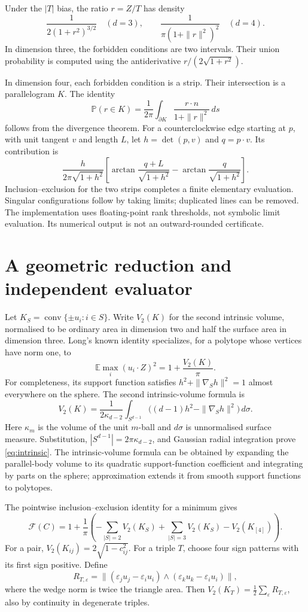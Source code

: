 \documentclass[11pt,a4paper]{article}
\theoremstyle{remark}\newtheorem{remark}[theorem]{Remark}
\newcommand{\E}{\mathbb E}
\newcommand{\Prb}{\mathbb P}
\newcommand{\F}{\mathcal F}
\begin{document}
Under the $|T|$ bias, the ratio $r=Z/T$ has density
\[
 \frac1{2(1+r^2)^{3/2}}\quad(d=3),\qquad
 \frac1{\pi(1+\|r\|^2)^2}\quad(d=4).
\]
In dimension three, the forbidden conditions are two intervals. Their union probability is computed using the antiderivative $r/(2\sqrt{1+r^2})$.

In dimension four, each forbidden condition is a strip. Their intersection is a parallelogram $K$. The identity
\[
 \Prb(r\in K)=\frac1{2\pi}\int_{\partial K}\frac{r\cdot n}{1+\|r\|^2}\,ds
\]
follows from the divergence theorem. For a counterclockwise edge starting at $p$, with unit tangent $v$ and length $L$, let $h=\det(p,v)$ and $q=p\cdot v$. Its contribution is
\[
 \frac{h}{2\pi\sqrt{1+h^2}}
 \left[\arctan\frac{q+L}{\sqrt{1+h^2}}
       -\arctan\frac{q}{\sqrt{1+h^2}}\right].
\]
Inclusion--exclusion for the two strips completes a finite elementary evaluation. Singular configurations follow by taking limits; duplicated lines can be removed. The implementation uses floating-point rank thresholds, not symbolic limit evaluation. Its numerical output is not an outward-rounded certificate.

\section{A geometric reduction and independent evaluator}\label{sec:intrinsic}
Let $K_S=\operatorname{conv}\{\pm u_i:i\in S\}$. Write $V_2(K)$ for the second intrinsic volume, normalised to be ordinary area in dimension two and half the surface area in dimension three. Long's known identity \cite[Theorem 1.2]{long} specializes, for a polytope whose vertices have norm one, to
\begin{equation}\label{eq:intrinsic}
 \E\max_i(u_i\cdot Z)^2=1+\frac{V_2(K)}\pi.
\end{equation}
For completeness, its support function satisfies $h^2+\|\nabla_Sh\|^2=1$ almost everywhere on the sphere. The second intrinsic-volume formula is
\[
 V_2(K)=\frac1{2\kappa_{d-2}}
 \int_{S^{d-1}}\big((d-1)h^2-\|\nabla_Sh\|^2\big)\,d\sigma.
\]
Here $\kappa_m$ is the volume of the unit $m$-ball and $d\sigma$ is unnormalised surface measure. Substitution, $|S^{d-1}|=2\pi\kappa_{d-2}$, and Gaussian radial integration prove \eqref{eq:intrinsic}. The intrinsic-volume formula can be obtained by expanding the parallel-body volume to its quadratic support-function coefficient and integrating by parts on the sphere; approximation extends it from smooth support functions to polytopes.

The pointwise inclusion--exclusion identity for a minimum gives
\begin{equation}\label{eq:ie-v2}
 \F(C)=1+\frac1\pi\left(-\sum_{|S|=2}V_2(K_S)
                  +\sum_{|S|=3}V_2(K_S)-V_2(K_{[4]})\right).
\end{equation}
For a pair, $V_2(K_{ij})=2\sqrt{1-c_{ij}^2}$. For a triple $T$, choose four sign patterns with its first sign positive. Define
\[
 R_{T,\varepsilon}=
 \big\|(\varepsilon_j u_j-\varepsilon_i u_i)
       \wedge(\varepsilon_k u_k-\varepsilon_i u_i)\big\|,
\]
where the wedge norm is twice the triangle area. Then
$V_2(K_T)=\frac12\sum_{\varepsilon}R_{T,\varepsilon}$, also by continuity in degenerate triples.
\end{document}
